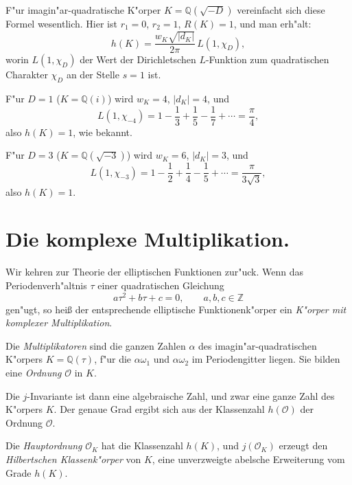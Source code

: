 \documentclass[12pt,a4paper]{article}
\theoremstyle{definition}
\begin{document}
F"ur imagin"ar-quadratische K"orper $K = \mathbb{Q}(\sqrt{-D})$ vereinfacht sich diese Formel wesentlich. Hier ist $r_1 = 0$, $r_2 = 1$, $R(K) = 1$, und man erh"alt:
\begin{equation}\tag{2}
h(K) = \frac{w_K\sqrt{|d_K|}}{2\pi}\,L(1,\chi_D),
\end{equation}
worin $L(1,\chi_D)$ der Wert der Dirichletschen $L$-Funktion zum quadratischen Charakter $\chi_D$ an der Stelle $s=1$ ist.

\newpage

F"ur $D = 1$ ($K = \mathbb{Q}(i)$) wird $w_K = 4$, $|d_K| = 4$, und
\[L(1,\chi_{-4}) = 1 - \frac{1}{3} + \frac{1}{5} - \frac{1}{7} + \cdots = \frac{\pi}{4},
\]
also $h(K) = 1$, wie bekannt.

F"ur $D = 3$ ($K = \mathbb{Q}(\sqrt{-3})$) wird $w_K = 6$, $|d_K| = 3$, und
\[L(1,\chi_{-3}) = 1 - \frac{1}{2} + \frac{1}{4} - \frac{1}{5} + \cdots = \frac{\pi}{3\sqrt{3}},
\]
also $h(K) = 1$.

\section{Die komplexe Multiplikation.}

Wir kehren zur Theorie der elliptischen Funktionen zur"uck. Wenn das Periodenverh"altnis $\tau$ einer quadratischen Gleichung
\begin{equation}\tag{1}
a\tau^2 + b\tau + c = 0,\qquad a,b,c \in \mathbb{Z}
\end{equation}
gen"ugt, so hei\ss{} der entsprechende elliptische Funktionenk"orper ein \emph{K"orper mit komplexer Multiplikation}.

\newpage

Die \emph{Multiplikatoren} sind die ganzen Zahlen $\alpha$ des imagin"ar-quadratischen K"orpers $K = \mathbb{Q}(\tau)$, f"ur die $\alpha\omega_1$ und $\alpha\omega_2$ im Periodengitter liegen. Sie bilden eine \emph{Ordnung} $\mathcal{O}$ in $K$.

Die $j$-Invariante ist dann eine algebraische Zahl, und zwar eine ganze Zahl des K"orpers $K$. Der genaue Grad ergibt sich aus der Klassenzahl $h(\mathcal{O})$ der Ordnung $\mathcal{O}$.

Die \emph{Hauptordnung} $\mathcal{O}_K$ hat die Klassenzahl $h(K)$, und $j(\mathcal{O}_K)$ erzeugt den \emph{Hilbertschen Klassenk"orper} von $K$, eine unverzweigte abelsche Erweiterung vom Grade $h(K)$.

\newpage
\end{document}
